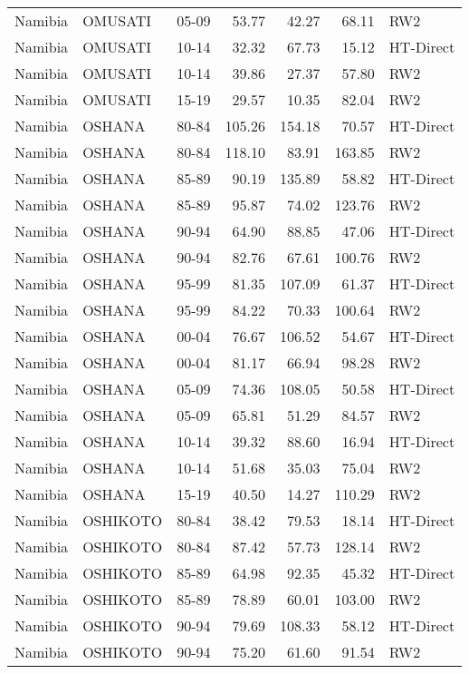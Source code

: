\begin{longtable}{lllrrrl}
  Namibia & OMUSATI & 05-09 & 53.77 & 42.27 & 68.11 & RW2 \\ 
  Namibia & OMUSATI & 10-14 & 32.32 & 67.73 & 15.12 & HT-Direct \\ 
  Namibia & OMUSATI & 10-14 & 39.86 & 27.37 & 57.80 & RW2 \\ 
  Namibia & OMUSATI & 15-19 & 29.57 & 10.35 & 82.04 & RW2 \\ 
  Namibia & OSHANA & 80-84 & 105.26 & 154.18 & 70.57 & HT-Direct \\ 
  Namibia & OSHANA & 80-84 & 118.10 & 83.91 & 163.85 & RW2 \\ 
  Namibia & OSHANA & 85-89 & 90.19 & 135.89 & 58.82 & HT-Direct \\ 
  Namibia & OSHANA & 85-89 & 95.87 & 74.02 & 123.76 & RW2 \\ 
  Namibia & OSHANA & 90-94 & 64.90 & 88.85 & 47.06 & HT-Direct \\ 
  Namibia & OSHANA & 90-94 & 82.76 & 67.61 & 100.76 & RW2 \\ 
  Namibia & OSHANA & 95-99 & 81.35 & 107.09 & 61.37 & HT-Direct \\ 
  Namibia & OSHANA & 95-99 & 84.22 & 70.33 & 100.64 & RW2 \\ 
  Namibia & OSHANA & 00-04 & 76.67 & 106.52 & 54.67 & HT-Direct \\ 
  Namibia & OSHANA & 00-04 & 81.17 & 66.94 & 98.28 & RW2 \\ 
  Namibia & OSHANA & 05-09 & 74.36 & 108.05 & 50.58 & HT-Direct \\ 
  Namibia & OSHANA & 05-09 & 65.81 & 51.29 & 84.57 & RW2 \\ 
  Namibia & OSHANA & 10-14 & 39.32 & 88.60 & 16.94 & HT-Direct \\ 
  Namibia & OSHANA & 10-14 & 51.68 & 35.03 & 75.04 & RW2 \\ 
  Namibia & OSHANA & 15-19 & 40.50 & 14.27 & 110.29 & RW2 \\ 
  Namibia & OSHIKOTO & 80-84 & 38.42 & 79.53 & 18.14 & HT-Direct \\ 
  Namibia & OSHIKOTO & 80-84 & 87.42 & 57.73 & 128.14 & RW2 \\ 
  Namibia & OSHIKOTO & 85-89 & 64.98 & 92.35 & 45.32 & HT-Direct \\ 
  Namibia & OSHIKOTO & 85-89 & 78.89 & 60.01 & 103.00 & RW2 \\ 
  Namibia & OSHIKOTO & 90-94 & 79.69 & 108.33 & 58.12 & HT-Direct \\ 
  Namibia & OSHIKOTO & 90-94 & 75.20 & 61.60 & 91.54 & RW2 \\ 

\end{longtable}
